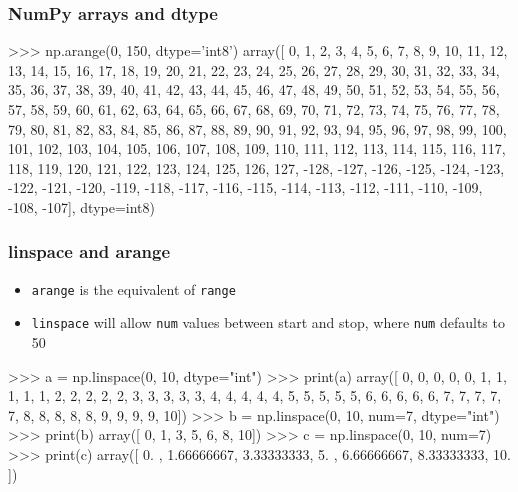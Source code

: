 \documentclass{beamer}
\begin{document}
\begin{frame}[fragile]
\frametitle{NumPy arrays and dtype}
\begin{code}
>>> np.arange(0, 150, dtype='int8')
array([   0,    1,    2,    3,    4,    5,    6,    7,    8,    9,   10,
         11,   12,   13,   14,   15,   16,   17,   18,   19,   20,   21,
         22,   23,   24,   25,   26,   27,   28,   29,   30,   31,   32,
         33,   34,   35,   36,   37,   38,   39,   40,   41,   42,   43, 
         44,   45,   46,   47,   48,   49,   50,   51,   52,   53,   54,
         55,   56,   57,   58,   59,   60,   61,   62,   63,   64,   65,
         66,   67,   68,   69,   70,   71,   72,   73,   74,   75,   76,
         77,   78,   79,   80,   81,   82,   83,   84,   85,   86,   87,
         88,   89,   90,   91,   92,   93,   94,   95,   96,   97,   98,
         99,  100,  101,  102,  103,  104,  105,  106,  107,  108,  
        109, 110,  111,  112,  113,  114,  115,  116,  117,  118,  
        119,  120, 121,  122,  123,  124,  125,  126,  127, -128, 
       -127, -126, -125, -124, -123, -122, -121, -120, -119, 
       -118, -117, -116, -115, -114, -113, -112, -111, -110, 
       -109, -108, -107], dtype=int8)
\end{code}
\end{frame}


\begin{frame}[fragile]
\frametitle{linspace and arange}
\begin{itemize}
\item \texttt{arange} is the equivalent of \texttt{range}
\item \texttt{linspace} will allow \texttt{num} values between start
  and stop, where \texttt{num} defaults to 50
\end{itemize}
\begin{code}
>>> a = np.linspace(0, 10, dtype="int")
>>> print(a)
array([ 0,  0,  0,  0,  0,  1,  1,  1,  1,  1,  2,  2,  2,  2,  2,  3, 
        3,  3,  3,  3,  4,  4,  4,  4,  4,  5,  5,  5,  5,  5,  6,  6, 
        6, 6, 6,  7,  7,  7,  7,  7,  8,  8,  8,  8,  8,  9,  9,  
        9, 9, 10])
>>> b = np.linspace(0, 10, num=7, dtype="int")
>>> print(b)
array([ 0,  1,  3,  5,  6,  8, 10])
>>> c = np.linspace(0, 10, num=7)
>>> print(c)
array([  0. ,  1.66666667, 3.33333333,  5.   ,
         6.66666667,   8.33333333,  10.  ])
\end{code}
\end{frame}
\end{document}
